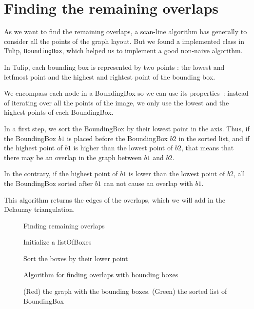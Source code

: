\documentclass[12pt]{report}
\begin{document}
\section{Finding the remaining overlaps}
As we want to find the remaining overlaps, a scan-line algorithm has generally to consider all the points of the graph layout. But we found a implemented class in Tulip, \texttt{BoundingBox}, which helped us to implement a good non-naive algorithm. 

\bigskip
In Tulip, each bounding box is represented by two points : the lowest and letfmost point and the highest and rightest point of the bounding box.

We encompass each node in a BoundingBox so we can use its properties~: instead of iterating over all the points of the image, we only use the lowest and the highest points of each BoundingBox. 

\bigskip
In a first step, we sort the BoundingBox by their lowest point in the axis. Thus, if the BoundingBox $b1$ is placed before the BoundingBox $b2$ in the sorted list, and if the highest point of $b1$ is higher than the lowest point of $b2$, that means that there may be an overlap in the graph between $b1$ and $b2$. 

In the contrary, if the highest point of $b1$ is lower than the lowest point of $b2$, all the BoundingBox sorted after $b1$ can not cause an overlap with $b1$.

\bigskip
This algorithm returns the edges of the overlaps, which we will add in the Delaunay triangulation.

\begin{figure}
\begin{algorithm}[H]
\caption{Finding remaining overlaps}
Initialize a listOfBoxes

Sort the boxes by their lower point

	{}
\end{algorithm}
\caption{Algorithm for finding overlaps with bounding boxes}
\label{algscanline}
\end{figure}

\begin{figure}[h]
  \center
  \setlength\fboxsep{5pt}
  \setlength\fboxrule{0.5pt}
  \caption{(Red) the graph with the bounding boxes. (Green) the sorted list of BoundingBox}
  \label{scanline}
\end{figure}
\end{document}
